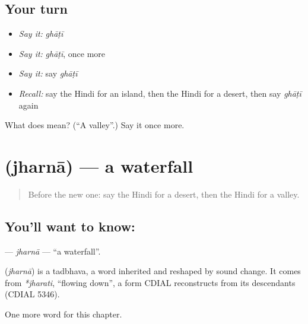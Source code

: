 \subsection*{Your turn}
\begin{itemize}
\raggedright
  \item \emph{Say it:} \emph{ghāṭī}
  \item \emph{Say it:} \emph{ghāṭī}, once more
  \item \emph{Say it:} say \emph{ghāṭī}
  \item \emph{Recall:} say the Hindi for an island, then the Hindi for a desert, then say \emph{ghāṭī} again
\end{itemize}

\begin{tcolorbox}[breakable,colback=teal!4,colframe=teal!35!black,title={Before you move on}]
What does  mean? (\textquotedblleft{}A valley\textquotedblright{}.) Say it once more.
\end{tcolorbox}
\section[\texorpdfstring{\hi{झरना} (jharnā)}{झरना (jharnā)}]{ (jharnā) — a waterfall}

\label{lesson:HI-C201-jharna}



\begin{quote}
Before the new one: say the Hindi for a desert, then the Hindi for a valley.
\end{quote}

\subsection*{You'll want to know: }
\textbf{} — \emph{jharnā} — \textquotedblleft{}a waterfall\textquotedblright{}.

\begin{cousinweb}
\textbf{} (\emph{jharnā}) is a tadbhava, a word inherited and reshaped by sound change. It comes from \emph{*jharati}, \textquotedblleft{}flowing down\textquotedblright{}, a form CDIAL reconstructs from its descendants (CDIAL 5346).
\end{cousinweb}

\begin{grammarlens}[title={What you've built}]
One more word for this chapter.
\end{grammarlens}

